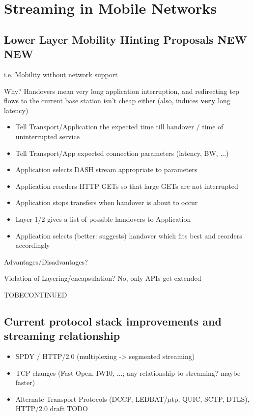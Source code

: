 \chapter{Streaming in Mobile Networks}


\section{Lower Layer Mobility Hinting Proposals NEW NEW}

i.e. Mobility without network support

Why? Handovers mean very long application interruption, and redirecting tcp flows to the current base station isn't cheap either (also, induces \textbf{very} long latency)

\begin{itemize}
\item Tell Transport/Application the expected time till handover / time of uninterrupted service
\item Tell Transport/App expected connection parameters (latency, BW, ...)
\item Application selects DASH stream appropriate to parameters
\item Application reorders HTTP GETs so that large GETs are not interrupted
\item Application stops transfers when handover is about to occur
\item Layer 1/2 gives a list of possible handovers to Application
\item Application selects (better: suggests) handover which fits best and reorders accordingly
\end{itemize}

Advantages/Disadvantages?

Violation of Layering/encapsulation? No, only APIs get extended 

TOBECONTINUED



\section{Current protocol stack improvements and streaming relationship}

\begin{itemize}
\item SPDY / HTTP/2.0 (multiplexing -> segmented streaming)
\item TCP changes (Fast Open, IW10, ...; any relationship to streaming? maybe faster)
\item Alternate Transport Protocols (DCCP\cite{rfc4340}, LEDBAT\cite{rfc6817}/$\mu$tp\cite{bt2010utp}, QUIC, SCTP, DTLS), HTTP/2.0 draft TODO
\end{itemize}



